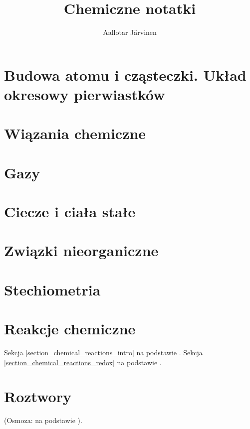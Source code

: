 \documentclass{createspace}
\author{Aallotar Järvinen}
\title{Chemiczne notatki}
\begin{document}





\tableofcontents

\chapter{Budowa atomu i cząsteczki. Układ okresowy pierwiastków}



\chapter{Wiązania chemiczne}

\chapter{Gazy}


\chapter{Ciecze i ciała stałe}


\chapter{Związki nieorganiczne}





\chapter{Stechiometria}


\chapter{Reakcje chemiczne}




Sekcja \ref{section_chemical_reactions_intro} na podstawie \cite[s. 91-97]{jones_atkins}.
Sekcja \ref{section_chemical_reactions_redox} na podstawie \cite[s. 118-126]{jones_atkins}.

\chapter{Roztwory}





(Osmoza: na podstawie \cite[s. 584-586]{jones_atkins}).

\end{document}

